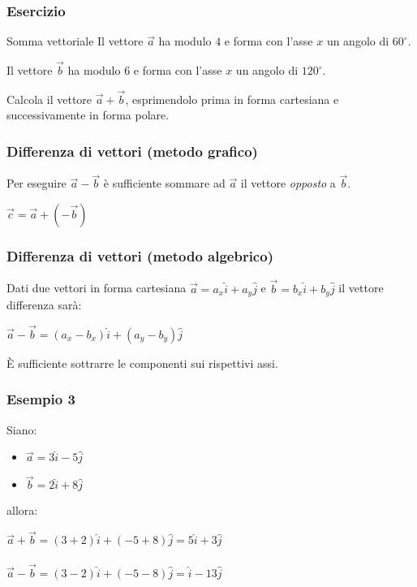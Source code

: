 \documentclass[]{beamer}
\theoremstyle{plain}
\begin{document}
\begin{frame}
\frametitle{Esercizio}
\begin{exampleblock}{Somma vettoriale}
Il vettore $ \vec{a} $ ha modulo $ 4 $ e forma con l'asse $ x $ un angolo di $ 60^\circ $.

Il vettore $ \vec{b} $ ha modulo $ 6 $ e forma con l'asse $ x $ un angolo di $ 120^\circ $.

Calcola il vettore $ \vec{a} + \vec{b} $, esprimendolo prima in forma cartesiana e successivamente in forma polare.
\end{exampleblock} 
\end{frame}


\begin{frame}
  \frametitle{Differenza di vettori (metodo grafico)}
  Per eseguire $ \vec{a} - \vec{b} $ è sufficiente sommare ad $ \vec{a} $ il vettore \emph{opposto} a $ \vec{b} $.\pause
  
  
\begin{figure}
\end{figure}
\begin{center}
\colorbox{blue!30}{ $ \vec{c} = \vec{a} + (-\vec{b}) $ }
\end{center}
\end{frame}


\begin{frame}
  \frametitle{Differenza di vettori (metodo algebrico)}
  Dati due vettori in forma cartesiana $ \vec{a} = a_x \hat{i} + a_y \hat{j} $ e  $ \vec{b} = b_x \hat{i} + b_y \hat{j} $ il vettore differenza sarà: 
 \begin{center}
 \colorbox{blue!30}{ $  \vec{a} - \vec{b} =  (a_x - b_x) \hat{i} + (a_y - b_y) \hat{j} $ }
 \end{center}
 È sufficiente sottrarre le componenti sui rispettivi assi.
\end{frame}


\begin{frame}
  \frametitle{Esempio 3}


Siano:
\begin{itemize}
  \item $ \vec{a} = 3 \hat{i} - 5\hat{j} $
  \item $ \vec{b} = 2 \hat{i} + 8 \hat{j} $
\end{itemize}
allora:
\begin{center}
$ \vec{a} + \vec{b} = (3+2)\hat{i} + (-5+8)\hat{j} = 5\hat{i} + 3\hat{j} $\\~\\
$ \vec{a} - \vec{b} = (3-2)\hat{i} + (-5-8)\hat{j} = \hat{i} - 13\hat{j} $
\end{center}
\end{frame}
\end{document}
